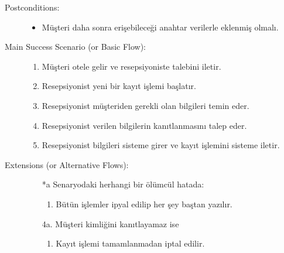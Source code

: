 \documentclass[12pt,a4paper]{report}
\begin{document}
\begin{description}
\item[Postconditions:] \hspace{10mm}
\begin{itemize}
\item Müşteri daha sonra erişebileceği anahtar verilerle eklenmiş olmalı.
\end{itemize}
\item[Main Success Scenario (or Basic Flow):] \hspace{10mm}
\begin{enumerate}
\item Müşteri otele gelir ve resepsiyoniste talebini iletir.
\item Resepsiyonist yeni bir kayıt işlemi başlatır.
\item Resepsiyonist müşteriden gerekli olan bilgileri temin eder.
\item Resepsiyonist verilen bilgilerin kanıtlanmasını talep eder.
\item Resepsiyonist bilgileri sisteme girer ve kayıt işlemini sisteme iletir.
\end{enumerate}
\item[Extensions (or Alternative Flows):] \hspace{10mm}
\begin{itemize}
\item[*a] Senaryodaki herhangi bir ölümcül hatada:
    \begin{enumerate}
    \item Bütün işlemler ipyal edilip her şey baştan yazılır.
    \end{enumerate}
\item[4a.] Müşteri kimliğini kanıtlayamaz ise
    \begin{enumerate} 
    \item Kayıt işlemi tamamlanmadan iptal edilir.
    \end{enumerate}
\end{itemize}

\end{description}
\end{document}
